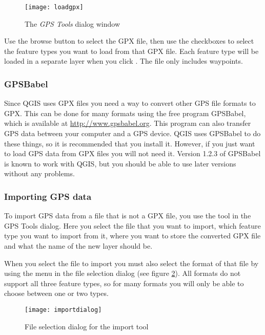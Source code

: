 \begin{figure}[ht]
   \begin{center}
\caption{\label{gpxloader}The \emph{GPS Tools} dialog window \nixcaption}
\texttt{[image: loadgpx]}
\end{center}
\end{figure}

Use the browse button \browsebutton to select the GPX file, then use the
checkboxes to select the feature types you want to load from that GPX file.
Each feature type will be loaded in a separate layer when you click .
The file  only includes waypoints.

\subsubsection{GPSBabel}

Since QGIS uses GPX files you need a way to convert other GPS file formats to GPX.
This can be done for many formats using the free program GPSBabel, which is available at \url{http://www.gpsbabel.org}.
This program can also transfer GPS data between your computer and a GPS device.
QGIS uses GPSBabel to do these things, so it is recommended that you install it.
However, if you just want to load GPS data from GPX files you will not need it.
Version 1.2.3 of GPSBabel is known to work with QGIS, but you should be able to use later versions without
any problems.


\subsubsection{Importing GPS data}

To import GPS data from a file that is not a GPX file, you use the tool  in the GPS Tools dialog.
Here you select the file that you want to import, which feature type you want to import from it, where you want to store the converted GPX file and what the name of the new layer should be.

When you select the file to import you must also select the format of that file by using the menu in the file selection dialog (see figure \ref{figure importdialog}). All formats do not support all three feature types, so for many formats 
you will only be able to choose between one or two types. 

\begin{figure}[ht]
   \begin{center}
\caption{\label{figure importdialog}File selection dialog for the import
tool \nixcaption}
\texttt{[image: importdialog]}
   \end{center}
\end{figure}

